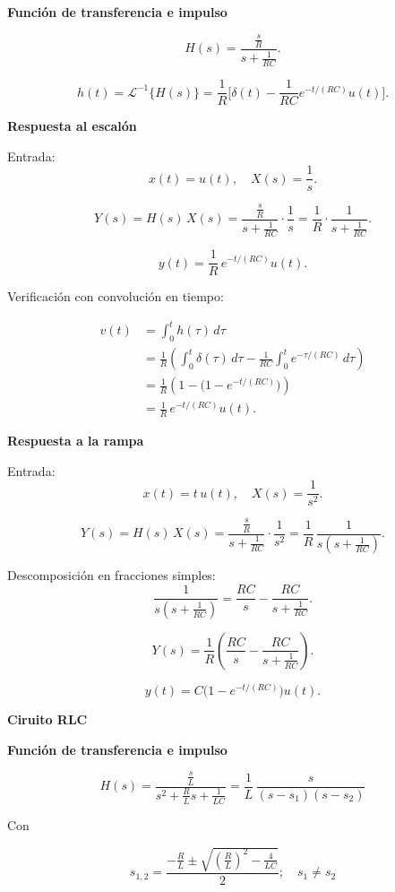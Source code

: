\textbf{Función de transferencia e impulso}

\[
H(s) = \frac{\tfrac{s}{R}}{s+\tfrac{1}{RC}}.
\]

\[
h(t) = \mathscr{L}^{-1}\{H(s)\} 
= \frac{1}{R}\Big[\delta(t)-\frac{1}{RC}e^{-t/(RC)}u(t)\Big].
\]

\textbf{Respuesta al escalón}

Entrada:
\[
x(t)=u(t), \quad X(s)=\frac{1}{s}.
\]

\[
Y(s) = H(s)\,X(s) 
= \frac{\tfrac{s}{R}}{s+\tfrac{1}{RC}} \cdot \frac{1}{s}
= \frac{1}{R}\cdot \frac{1}{s+\tfrac{1}{RC}}.
\]

\[
y(t) = \frac{1}{R}\,e^{-t/(RC)}u(t).
\]

Verificación con convolución en tiempo:

\begin{align*}
v(t) &= \int_{0}^{t} h(\tau)\,d\tau \\
     &= \frac{1}{R}\left( \int_{0}^{t}\delta(\tau)\,d\tau 
     - \frac{1}{RC}\int_{0}^{t} e^{-\tau/(RC)}\,d\tau \right) \\
     &= \frac{1}{R}\left(1 - \big(1-e^{-t/(RC)}\big)\right) \\
     &= \frac{1}{R}\,e^{-t/(RC)}u(t).
\end{align*}

\textbf{Respuesta a la rampa}

Entrada:
\[
x(t)=t\,u(t), \quad X(s)=\frac{1}{s^2}.
\]

\[
Y(s) = H(s)\,X(s) 
= \frac{\tfrac{s}{R}}{s+\tfrac{1}{RC}} \cdot \frac{1}{s^2}
= \frac{1}{R}\,\frac{1}{s(s+\tfrac{1}{RC})}.
\]

Descomposición en fracciones simples:
\[
\frac{1}{s(s+\tfrac{1}{RC})} = \frac{RC}{s} - \frac{RC}{s+\tfrac{1}{RC}}.
\]

\[
Y(s)=\frac{1}{R}\left(\frac{RC}{s}-\frac{RC}{s+\tfrac{1}{RC}}\right).
\]

\[
y(t) = C\big(1-e^{-t/(RC)}\big)u(t).
\]

\textbf{Ciruito RLC}

\textbf{Función de transferencia e impulso}

\[
H(s) = \frac{\tfrac{s}{L}}{s^2+\tfrac{R}{L}s+\tfrac{1}{LC}}
= \frac{1}{L}\,\frac{s}{(s-s_1)(s-s_2)}
\]

Con

\[
s_{1,2} = \frac{-\tfrac{R}{L}\pm \sqrt{\left(\tfrac{R}{L}\right)^2-\tfrac{4}{LC}}}{2} ; 
\quad s_1 \neq s_2
\]

